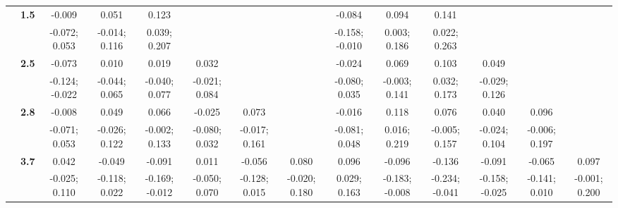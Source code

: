 \begin{landscape}
\begin{table}[!htp]
\begin{center}
\begin{tabular}{>{\bfseries}c>{\bfseries}ccccccccccccc}
 & 1.5 & -0.009 & 0.051 & 0.123 &  &  &  & -0.084 & 0.094 & 0.141 &  &  & \\
 &  & -0.072; 0.053 & -0.014; 0.116 & 0.039; 0.207 &  &  &  & -0.158; -0.010 & 0.003; 0.186 & 0.022; 0.263 &  &  & \\[0.7ex]
 & 2.5 & -0.073 & 0.010 & 0.019 & 0.032 &  &  & -0.024 & 0.069 & 0.103 & 0.049 &  & \\
 &  & -0.124; -0.022 & -0.044; 0.065 & -0.040; 0.077 & -0.021; 0.084 &  &  & -0.080; 0.035 & -0.003; 0.141 & 0.032; 0.173 & -0.029; 0.126 &  & \\[0.7ex]
 & 2.8 & -0.008 & 0.049 & 0.066 & -0.025 & 0.073 &  & -0.016 & 0.118 & 0.076 & 0.040 & 0.096 & \\
 &  & -0.071; 0.053 & -0.026; 0.122 & -0.002; 0.133 & -0.080; 0.032 & -0.017; 0.161 &  & -0.081; 0.048 & 0.016; 0.219 & -0.005; 0.157 & -0.024; 0.104 & -0.006; 0.197 & \\[0.7ex]
 & 3.7 & 0.042 & -0.049 & -0.091 & 0.011 & -0.056 & 0.080 & 0.096 & -0.096 & -0.136 & -0.091 & -0.065 & 0.097\\
 &  & -0.025; 0.110 & -0.118; 0.022 & -0.169; -0.012 & -0.050; 0.070 & -0.128; 0.015 & -0.020; 0.180 & 0.029; 0.163 & -0.183; -0.008 & -0.234; -0.041 & -0.158; -0.025 & -0.141; 0.010 & -0.001; 0.200\\[0.7ex]
\bottomrule
\end{tabular}
\end{center}
\end{table}
\end{landscape}
 \newpage

